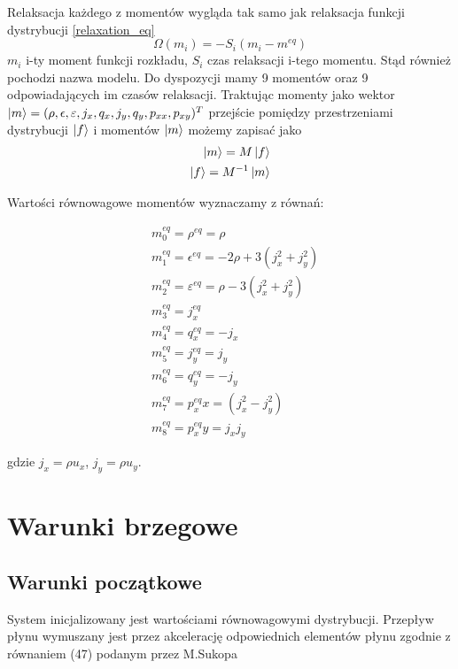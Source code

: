 \documentclass[a4paper,11pt,twoside]{article}
\begin{document}
Relaksacja każdego z momentów wygląda tak samo jak relaksacja funkcji dystrybucji \ref{relaxation_eq}
\begin{equation}
\Omega(m_i) = - S_i(m_i - m^{eq})
\label{moment_relaxation_eq}
\end{equation}
$m_i$ i-ty moment funkcji rozkładu, $S_i$ czas relaksacji i-tego momentu. Stąd również pochodzi nazwa modelu. Do dyspozycji mamy 9 momentów oraz 9 odpowiadających im czasów relaksacji. Traktując momenty jako wektor $\ket{m} = (\rho, \epsilon, \varepsilon, j_x, q_x, j_y, q_y, p_{xx}, p_{xy})^T$ przejście pomiędzy przestrzeniami dystrybucji $\ket{f}$ i momentów  $\ket{m}$ możemy zapisać jako
\begin{eqnarray}
\ket{m} = M\ket{f} \\
\label{tr_f_m}
\ket{f} = M^{-1}\ket{m}
\label{tr_m_f}
\end{eqnarray}

Wartości równowagowe momentów wyznaczamy z równań:

\begin{eqnarray}
&m^{eq}_0 = \rho^{eq} = \rho \\
&m^{eq}_1 = \epsilon^{eq} = -2\rho + 3(j^2_x + j^2_y) \\
&m^{eq}_2 = \varepsilon^{eq} = \rho - 3(j^2_x + j^2_y)  \\
&m^{eq}_3 = j^{eq}_x\\ 
&m^{eq}_4 = q^{eq}_x = -j_x    \\ 
&m^{eq}_5 = j^{eq}_y = j_y  \\
&m^{eq}_6 = q^{eq}_y = -j_y      \\
&m^{eq}_7 = p^{eq}_xx = (j^2_x - j^2_y)  \\
&m^{eq}_8 = p^{eq}_xy = j_xj_y
\label{moment_equilibria}
\end{eqnarray}

gdzie $j_x = \rho u_x$, $j_y = \rho u_y$.

\section{Warunki brzegowe}

\subsection{Warunki początkowe}
System inicjalizowany jest wartościami równowagowymi dystrybucji. Przepływ płynu wymuszany jest przez akcelerację odpowiednich elementów płynu zgodnie z równaniem (47) podanym przez M.Sukopa \cite{sukop}



\newpage


\end{document}
